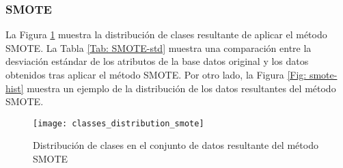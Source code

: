 \FloatBarrier
\subsubsection{SMOTE}
La Figura \ref{Fig: SMOTE-class} muestra la distribución de clases resultante de aplicar el método SMOTE. La Tabla \ref{Tab: SMOTE-std} muestra una comparación entre la desviación estándar de los atributos de la base datos original y los datos obtenidos tras aplicar el método SMOTE. Por otro lado, la Figura \ref{Fig: smote-hist} muestra un ejemplo de la distribución de los datos resultantes del método SMOTE.

\begin{figure}[!htb]
	\centering
	\texttt{[image: classes\_distribution\_smote]}
	\caption{Distribución de clases en el conjunto de datos resultante del método SMOTE}
	\label{Fig: SMOTE-class}
\end{figure}

